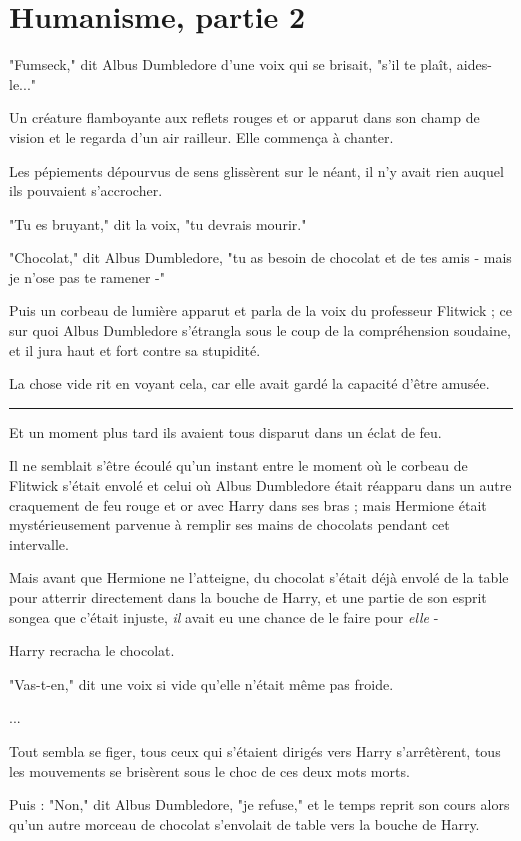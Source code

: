 
\chapter{Humanisme, partie 2}

"Fumseck," dit Albus Dumbledore d'une voix qui se brisait, "s'il te plaît, aides-le..."

Un créature flamboyante aux reflets rouges et or apparut dans son champ de vision et le regarda d'un air railleur. Elle commença à chanter.

Les pépiements dépourvus de sens glissèrent sur le néant, il n'y avait rien auquel ils pouvaient s'accrocher.

"Tu es bruyant," dit la voix, "tu devrais mourir."

"Chocolat," dit Albus Dumbledore, "tu as besoin de chocolat et de tes amis - mais je n'ose pas te ramener -"

Puis un corbeau de lumière apparut et parla de la voix du professeur Flitwick ; ce sur quoi Albus Dumbledore s'étrangla sous le coup de la compréhension soudaine, et il jura haut et fort contre sa stupidité.

La chose vide rit en voyant cela, car elle avait gardé la capacité d'être amusée.
\par\noindent\rule{\textwidth}{0.4pt}
Et un moment plus tard ils avaient tous disparut dans un éclat de feu.

Il ne semblait s'être écoulé qu'un instant entre le moment où le corbeau de Flitwick s'était envolé et celui où Albus Dumbledore était réapparu dans un autre craquement de feu rouge et or avec Harry dans ses bras ; mais Hermione était mystérieusement parvenue à remplir ses mains de chocolats pendant cet intervalle.

Mais avant que Hermione ne l'atteigne, du chocolat s'était déjà envolé de la table pour atterrir directement dans la bouche de Harry, et une partie de son esprit songea que c'était injuste, \emph{il}  avait eu une chance de le faire pour \emph{elle}  -

Harry recracha le chocolat.

"Vas-t-en," dit une voix si vide qu'elle n'était même pas froide.

...

Tout sembla se figer, tous ceux qui s'étaient dirigés vers Harry s'arrêtèrent, tous les mouvements se brisèrent sous le choc de ces deux mots morts.

Puis : "Non," dit Albus Dumbledore, "je refuse," et le temps reprit son cours alors qu'un autre morceau de chocolat s'envolait de table vers la bouche de Harry.

